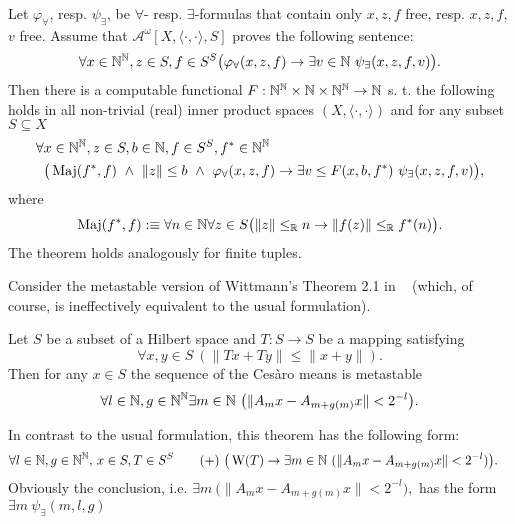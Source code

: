 \begin{thm}\label{t:GKmeta1}
Let $\varphi_\forall$, resp. $\psi_\exists$, be $\forall$-
resp. $\exists$-formulas that contain only $x,z,f$ free, resp. $x,z,f$, $v$ free. Assume that
$\mathcal{A}^\omega[X,\langle\cdot,\cdot\rangle,S]$ proves the following sentence:
\[
\forall  x\in\NN^\NN, z\in S, f\in{S^S} 
	\big( \varphi_\forall(x, z, f)\rightarrow\exists v\in\NN\ \psi_\exists(x, z, f, v)\big).
\]
Then there is a computable functional $F : \mathbb{N}^{\mathbb{N}}\times\mathbb{N}\times\mathbb{N}^{\mathbb{N}}\to\mathbb{N}$ s. t. the following holds
in all non-trivial (real) inner product spaces $(X,\langle\cdot,\cdot\rangle)$ 
and for any subset $S\subseteq X$
\begin{align*}
\forall  &x\in\NN^\NN, z\in S, b\in\NN, f\in{S^S},f^*\in\NN^\NN\\
	&\big( \TMaj(f^*,f)\ \wedge\ \|z\|\leq b\ \wedge\ \varphi_\forall(x, z, f) \rightarrow 
	\exists v\leq F(x,b,f^*)\ \psi_\exists(x, z, f, v) \big),
\end{align*}
where %
\[
\operatorname{Maj}(f^*,f):\equiv \forall n\in\mathbb{N}\forall z\in S \big( \|z\|\leq_{\mathbb{R}} n \rightarrow \|f(z)\|\leq_{\mathbb{R}} f^*(n)\big).
\]
The theorem holds analogously for finite tuples. %
\end{thm}
Consider the metastable version of Wittmann's Theorem 2.1 in ~\cite{Wittmann90} (which, of course, is
ineffectively equivalent to the usual formulation).
\begin{thm} \label{t:W21}
Let $S$ be a subset of a Hilbert space and $T:S\to S$
be a mapping satisfying 
\[
\forall x,y\in S\ (\| Tx + Ty \| \leq \|x + y\|).\tag{$\TAN$}\label{e:W}
\]
Then for any $x\in S$ the sequence of the Ces{\`a}ro means is metastable
\[
\forall l\in\mathbb{N},g\in\mathbb{N}^{\mathbb{N}}\exists m\in\mathbb{N}\ \big( \|A_mx-A_{m+g(m)}x\| < 2^{-l}\big).
\]
\end{thm}
In contrast to the usual formulation, this theorem has the following form:
\begin{align*}
\forall l\in\mathbb{N},g\in\mathbb{N}^{\mathbb{N}}, &\ x\in S, T\in S^S \tag{+}\label{e:w21meta}  
\ \big( \operatorname{W}(T)\rightarrow 
	\exists m\in\mathbb{N} \ (\|A_mx-A_{m+g(m)}x\|< 2^{-l})\big). 
\end{align*}
Obviously the conclusion, i.e. 
$
\exists m\ \big( \|A_mx-A_{m+g(m)}x\| < 2^{-l}\big),
$
has the form $\exists m\ \psi_\exists(m,l,g)$ 
